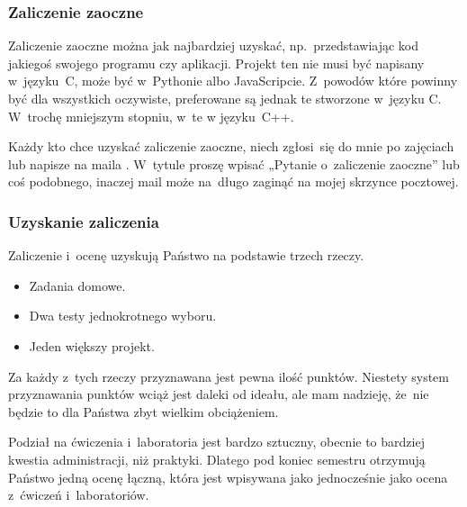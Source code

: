 \documentclass[10pt,t]{beamer}
\begin{document}
\begin{frame}
  \frametitle{Zaliczenie zaoczne}


  Zaliczenie zaoczne można jak najbardziej uzyskać, np.~przedstawiając
  kod jakiegoś swojego programu czy aplikacji. Projekt ten
  \alert{nie musi} być napisany w~języku~C, może być w~Pythonie albo
  JavaScripcie. Z~powodów które powinny być dla wszystkich oczywiste,
  preferowane są jednak te stworzone w~języku C. W~trochę mniejszym
  stopniu, w~te w języku~C++.

  Każdy kto chce uzyskać zaliczenie zaoczne, niech zgłosi~się do mnie po
  zajęciach lub napisze na maila \email. W~tytule proszę wpisać
  „Pytanie o~zaliczenie zaoczne” lub coś podobnego, inaczej mail może
  na~długo zaginąć na mojej skrzynce pocztowej.

\end{frame}





\begin{frame}
  \frametitle{Uzyskanie zaliczenia}


  Zaliczenie i~ocenę uzyskują Państwo na podstawie trzech rzeczy.

  \vspace{-0.3em}



  \begin{itemize}

  \item Zadania domowe.

  \item Dwa testy jednokrotnego wyboru.

  \item Jeden większy projekt.

  \end{itemize}

  \vspace{-0.3em}

  Za każdy z~tych rzeczy przyznawana jest pewna ilość punktów. Niestety
  system przyznawania punktów wciąż jest daleki od ideału, ale mam nadzieję,
  że~nie będzie to dla Państwa zbyt wielkim obciążeniem.

  Podział na ćwiczenia i~laboratoria jest bardzo sztuczny, obecnie
  to bardziej kwestia administracji, niż praktyki. Dlatego pod koniec
  semestru otrzymują Państwo \alert{jedną} ocenę łączną, która
  jest wpisywana jako jednocześnie jako ocena z~ćwiczeń i~laboratoriów.

\end{frame}
\end{document}
